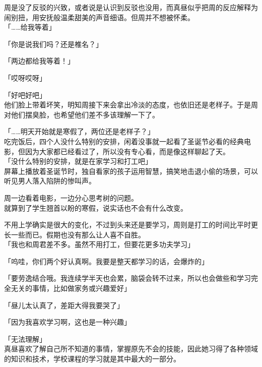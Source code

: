 周是没了反驳的兴致，或者说是认识到反驳也没用，而真昼似乎把周的反应解释为闹别扭，用安抚般温柔甜美的声音细语。但周并不想被怀柔。\\

「……给我等着」

「你是说我们吗？还是椎名？」

「两边都给我等着！」

「哎呀哎呀」

「好吧好吧」\\

他们脸上带着坏笑，明知周接下来会拿出冷淡的态度，也依旧还是老样子。于是周对他们摆臭脸，也希望他们差不多该理解一下了。\\

\vspace{2\baselineskip}

「……明天开始就是寒假了，两位还是老样子？」\\

吃完饭后，四个人没什么特别的安排，闲着没事就一起看了圣诞节必看的经典电影，但因为大家都已经看过了，所以没有专心看，而是像这样聊起了天。\\

「没什么特别的安排，就是在家学习和打工吧」\\

屏幕上播放着圣诞节时，独自看家的孩子运用智慧，搞笑地击退小偷的场景，可以听见男人落入陷阱的惨叫声。

周一边看着电影，一边分心思考树的问题。\\

就算到了学生翘首以盼的寒假，说实话也不会有什么改变。

不用上学确实是很大的变化，不过到头来还是要学习，周则是打工的时间比平时更长一些而已。假期也没有那么让人喜不自胜。\\

「我也和周君差不多。虽然不用打工，但要花更多功夫学习」

「呜哇，你们两个好认真啊。我要是整天都学习的话，会爆炸的」

「要劳逸结合哦。我连续学半天也会累，脑袋会转不过来，所以也会做些和学习完全无关的事情，比如做家务或兴趣爱好」

「昼儿太认真了，差距大得我要哭了」

「因为我喜欢学习啊，这也是一种兴趣」

「无法理解」\\

真昼喜欢了解自己所不知道的事情，掌握原先不会的技能，因此她习得了各种领域的知识和技术，学校课程的学习就是其中最大的一部分。\\

